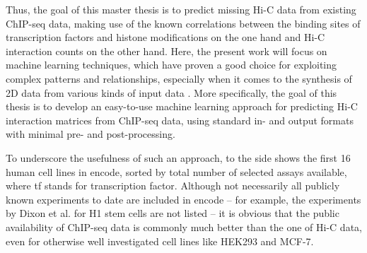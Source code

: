 Thus, the goal of this master thesis is to predict missing Hi-C data from existing ChIP-seq data,
making use of the known correlations between the binding sites of transcription factors and histone modifications on the one hand 
and Hi\mbox{-}C interaction counts on the other hand. 
Here, the present work will focus on machine learning techniques,
which have proven a good choice for exploiting complex patterns
and relationships, especially when it comes to the synthesis of 
2D data from various kinds of input data \cite{Tsirikoglou2020}.
More specifically, the goal of this thesis is to develop an easy-to-use machine learning
approach for predicting Hi-C interaction matrices from ChIP-seq data, 
using standard in- and output formats with minimal pre- and post-processing.

To underscore the usefulness of such an approach,  to the side shows the first 16 human cell lines in \acrshort{encode}, 
sorted by total number of selected assays available, where \acrshort{tf} stands for transcription factor.
Although not necessarily all publicly known experiments to date are included in \acrshort{encode} -- 
for example, the experiments by Dixon et al. \cite{Dixon2015} for H1 stem cells are not listed -- 
it is obvious that the public availability of ChIP-seq data is commonly much better than the one of Hi-C data, 
even for otherwise well investigated cell lines like HEK293 and MCF-7.

